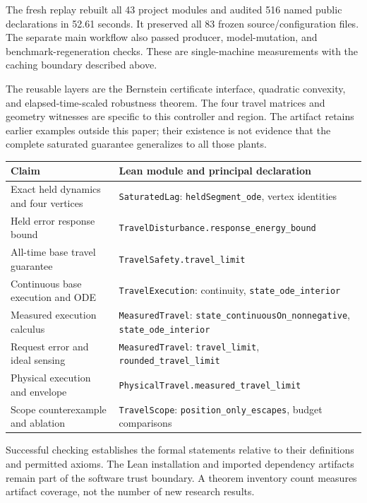 \documentclass[10pt]{article}
\newcommand{\code}[1]{\texttt{#1}}
\begin{document}
The fresh replay rebuilt all 43 project modules and audited 516 named public declarations in 52.61 seconds. It preserved all 83 frozen source/configuration files. The separate main workflow also passed producer, model-mutation, and benchmark-regeneration checks. These are single-machine measurements with the caching boundary described above.

The reusable layers are the Bernstein certificate interface, quadratic convexity, and elapsed-time-scaled robustness theorem. The four travel matrices and geometry witnesses are specific to this controller and region. The artifact retains earlier examples outside this paper; their existence is not evidence that the complete saturated guarantee generalizes to all those plants.

\begin{center}\small
\begin{tabular}{>{\raggedright\arraybackslash}p{}>{\raggedright\arraybackslash}p{}}
\toprule
Claim & Lean module and principal declaration\\\midrule
Exact held dynamics and four vertices & \code{SaturatedLag}: \code{heldSegment\_ode}, vertex identities\\
Held error response bound & \code{TravelDisturbance.response\_energy\_bound}\\
All-time base travel guarantee & \code{TravelSafety.travel\_limit}\\
Continuous base execution and ODE & \code{TravelExecution}: continuity, \code{state\_ode\_interior}\\
Measured execution calculus & \code{MeasuredTravel}: \code{state\_continuousOn\_nonnegative}, \code{state\_ode\_interior}\\
Request error and ideal sensing & \code{MeasuredTravel}: \code{travel\_limit}, \code{rounded\_travel\_limit}\\
Physical execution and envelope & \code{PhysicalTravel.measured\_travel\_limit}\\
Scope counterexample and ablation & \code{TravelScope}: \code{position\_only\_escapes}, budget comparisons\\\bottomrule
\end{tabular}
\end{center}
Successful checking establishes the formal statements relative to their definitions and permitted axioms. The Lean installation and imported dependency artifacts remain part of the software trust boundary. A theorem inventory count measures artifact coverage, not the number of new research results.
\end{document}
